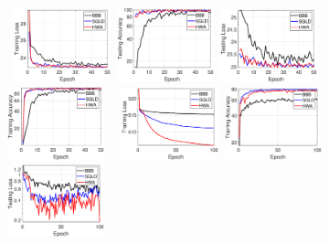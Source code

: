 \documentclass{article} %
\begin{document}
\begin{figure}[H]
\mbox{
\includegraphics[width=0.25\textwidth]{newfigs/trainlossmnist.eps}
\includegraphics[width=0.25\textwidth]{newfigs/trainaccmnist.eps}
\includegraphics[width=0.25\textwidth]{newfigs/testlossmnist.eps}
\includegraphics[width=0.25\textwidth]{newfigs/testaccmnist.eps}
}
\mbox{
\includegraphics[width=0.25\textwidth]{newfigs/trainlosscifar.eps}
\includegraphics[width=0.25\textwidth]{newfigs/trainacccifar.eps}
\includegraphics[width=0.25\textwidth]{newfigs/testlosscifar.eps}
}
\end{figure}
\end{document}

